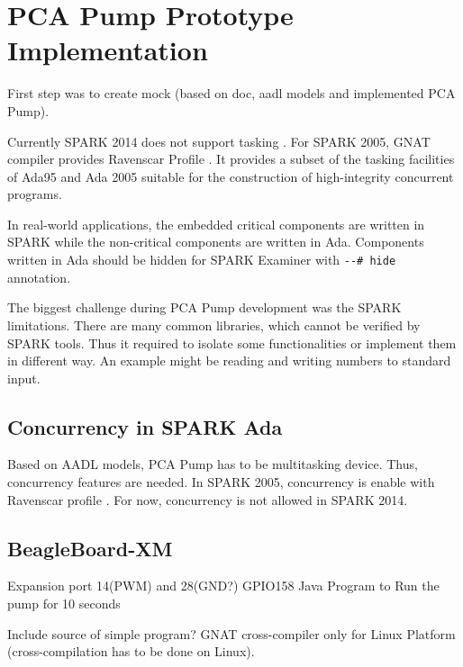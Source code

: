 
\cleardoublepage


\chapter{PCA Pump Prototype Implementation}
\label{pcapumpimpl}

First step was to create mock (based on doc, aadl models and implemented PCA Pump).

Currently SPARK 2014 does not support tasking \cite{Spark2014refManual:Online}. For SPARK 2005, GNAT compiler provides Ravenscar Profile \cite{Ravenscar:Online}. It provides a subset of the tasking facilities of Ada95 and Ada 2005 suitable for the construction of high-integrity concurrent programs.

In real-world applications, the embedded critical components are written in SPARK while the non-critical components are written in Ada. Components written in Ada should be hidden for SPARK Examiner with \lstinline{--# hide} annotation.

The biggest challenge during PCA Pump development was the SPARK limitations. There are many common libraries, which cannot be verified by SPARK tools. Thus it required to isolate some functionalities or implement them in different way. An example might be reading and writing numbers to standard input.


\section{Concurrency in SPARK Ada}
\label{pcapump:implementation:concurrency}

Based on AADL models, PCA Pump has to be multitasking device. Thus, concurrency features are needed. In SPARK 2005, concurrency is enable with Ravenscar profile \cite{Ravenscar:Online}. For now, concurrency is not allowed in SPARK 2014.



\section{BeagleBoard-XM}
\label{pcapumpimpl:beagleboard}


Expansion port 14(PWM) and 28(GND?)
GPIO158
Java Program to Run the pump for 10 seconds

Include source of simple program?
GNAT cross-compiler only for Linux Platform (cross-compilation has to be done on Linux).

